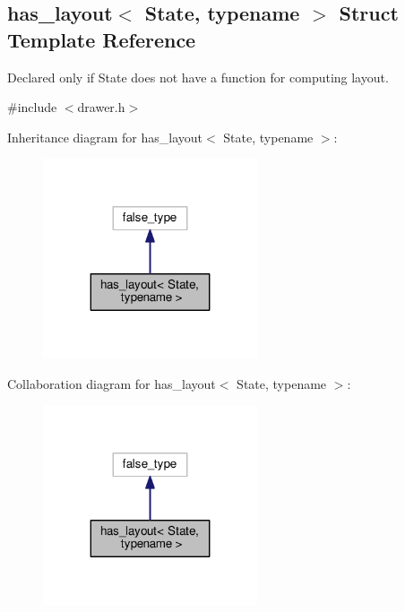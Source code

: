 \hypertarget{structhas__layout}{}\subsection{has\+\_\+layout$<$ State, typename $>$ Struct Template Reference}
\label{structhas__layout}


Declared only if {\ttfamily State} does not have a function for computing layout.  




{\ttfamily \#include $<$drawer.\+h$>$}



Inheritance diagram for has\+\_\+layout$<$ State, typename $>$\+:\nopagebreak
\begin{figure}[H]
\begin{center}
\leavevmode
\includegraphics[width=179pt]{structhas__layout__inherit__graph}
\end{center}
\end{figure}


Collaboration diagram for has\+\_\+layout$<$ State, typename $>$\+:\nopagebreak
\begin{figure}[H]
\begin{center}
\leavevmode
\includegraphics[width=179pt]{structhas__layout__coll__graph}
\end{center}
\end{figure}


